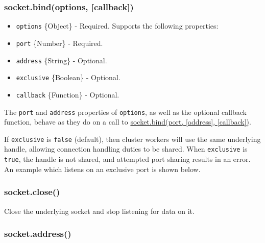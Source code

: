 \subsubsection{socket.bind(options,
{[}callback{]})}\label{socket.bindoptions-callback}

\begin{itemize}
\itemsep1pt\parskip0pt
\item
  \texttt{options} \{Object\} - Required. Supports the following
  properties:
\item
  \texttt{port} \{Number\} - Required.
\item
  \texttt{address} \{String\} - Optional.
\item
  \texttt{exclusive} \{Boolean\} - Optional.
\item
  \texttt{callback} \{Function\} - Optional.
\end{itemize}

The \texttt{port} and \texttt{address} properties of \texttt{options},
as well as the optional callback function, behave as they do on a call
to
\hyperref[dgramux5fsocketux5fbindux5fportux5faddressux5fcallback]{socket.bind(port,
{[}address{]}, {[}callback{]})}.

If \texttt{exclusive} is \texttt{false} (default), then cluster workers
will use the same underlying handle, allowing connection handling duties
to be shared. When \texttt{exclusive} is \texttt{true}, the handle is
not shared, and attempted port sharing results in an error. An example
which listens on an exclusive port is shown below.

\begin{Shaded}
\begin{Highlighting}[]
\NormalTok{(\{}
  \NormalTok{: }\NormalTok{,}
  \NormalTok{: }\NormalTok{,}
  \NormalTok{: }
\NormalTok{\});}
\end{Highlighting}
\end{Shaded}

\subsubsection{socket.close()}\label{socket.close}

Close the underlying socket and stop listening for data on it.

\subsubsection{socket.address()}\label{socket.address}

